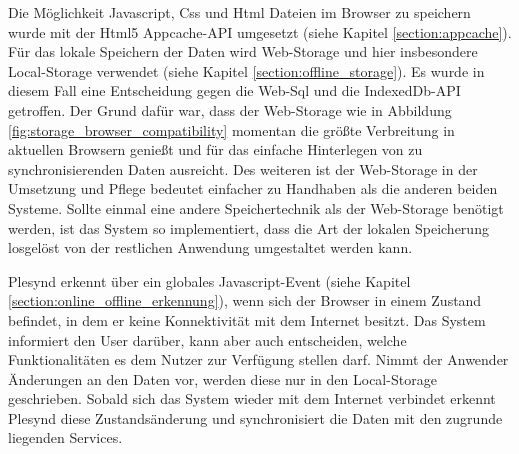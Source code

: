 Die Möglichkeit Javascript, Css und Html Dateien im Browser zu speichern wurde mit der Html5 Appcache-API umgesetzt (siehe Kapitel \ref{section:appcache}). Für das lokale Speichern der Daten wird Web-Storage und hier insbesondere Local-Storage verwendet (siehe Kapitel \ref{section:offline_storage}). Es wurde in diesem Fall eine Entscheidung gegen die Web-Sql und die IndexedDb-API getroffen. Der Grund dafür war, dass der Web-Storage wie in Abbildung \ref{fig:storage_browser_compatibility} momentan die größte Verbreitung in aktuellen Browsern genießt und für das einfache Hinterlegen von zu synchronisierenden Daten ausreicht. Des weiteren ist der Web-Storage in der Umsetzung und Pflege bedeutet einfacher zu Handhaben als die anderen beiden Systeme. Sollte einmal eine andere Speichertechnik als der Web-Storage benötigt werden, ist das System so implementiert, dass die Art der lokalen Speicherung losgelöst von der restlichen Anwendung umgestaltet werden kann.

Plesynd erkennt über ein globales Javascript-Event (siehe Kapitel \ref{section:online_offline_erkennung}), wenn sich der Browser in einem Zustand befindet, in dem er keine Konnektivität mit dem Internet besitzt. Das System informiert den User darüber, kann aber auch entscheiden, welche Funktionalitäten es dem Nutzer zur Verfügung stellen darf. Nimmt der Anwender Änderungen an den Daten vor, werden diese nur in den Local-Storage geschrieben. Sobald sich das System wieder mit dem Internet verbindet erkennt Plesynd diese Zustandsänderung und synchronisiert die Daten mit den zugrunde liegenden Services. 

